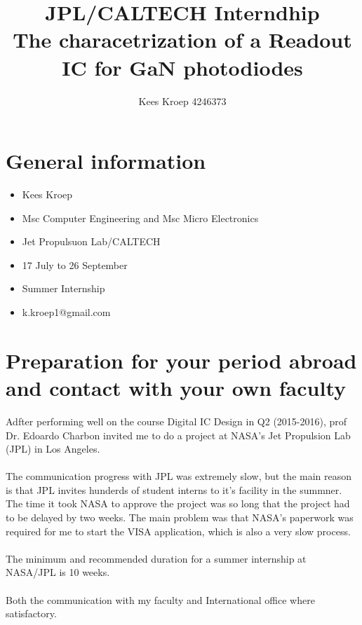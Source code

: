 \documentclass{article}
\title{JPL/CALTECH Interndhip\\ The characetrization of a Readout IC for GaN photodiodes}
\author{Kees Kroep 4246373}
\begin{document}
  \maketitle



\section{General information}
\begin{itemize}
    \item Kees Kroep
    \item Msc Computer Engineering and Msc Micro Electronics
    \item Jet Propulsuon Lab/CALTECH
    \item 17 July to 26 September
    \item Summer Internship
    \item k.kroep1@gmail.com
\end{itemize}

\section{Preparation for your period abroad and contact with your own faculty}
Adfter performing well on the course Digital IC Design in Q2 (2015-2016), prof Dr. Edoardo Charbon invited me to do a project at NASA's Jet Propulsion Lab (JPL) in Los Angeles.\\
\\
The communication progress with JPL was extremely slow, but the main reason is that JPL invites hunderds of student interns to it's facility in the summner. The time it took NASA to approve the project was so long that the project had to be delayed by two weeks. The main problem was that NASA's paperwork was required for me to start the VISA application, which is also a very slow process. \\
\\
The minimum and recommended duration for a summer internship at NASA/JPL is 10 weeks. \\
\\
Both the communication with my faculty and International office where satisfactory.
\end{document}
